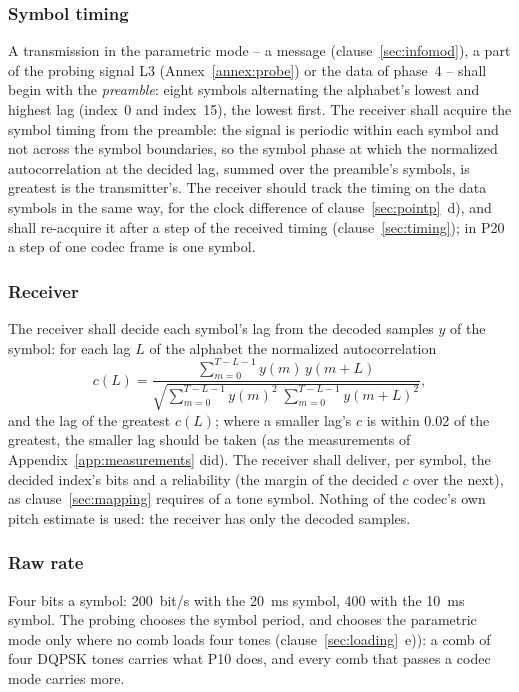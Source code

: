 \subsubsection{Symbol timing}
A transmission in the parametric mode -- a message
(clause~\ref{sec:infomod}), a part of the probing signal L3
(Annex~\ref{annex:probe}) or the data of phase~4 -- shall begin with the
\emph{preamble}: eight symbols alternating the alphabet's lowest and
highest lag (index~0 and index~15), the lowest first.  The receiver
shall acquire the symbol timing from the preamble: the signal is
periodic within each symbol and not across the symbol boundaries, so the
symbol phase at which the normalized autocorrelation at the decided lag,
summed over the preamble's symbols, is greatest is the transmitter's.
The receiver should track the timing on the data symbols in the same
way, for the clock difference of clause~\ref{sec:pointp}~d), and shall
re-acquire it after a step of the received timing
(clause~\ref{sec:timing}); in P20 a step of one codec frame is one
symbol.

\subsubsection{Receiver}
The receiver shall decide each symbol's lag from the decoded samples
$y$ of the symbol: for each lag $L$ of the alphabet the normalized
autocorrelation
\[ c(L) = \frac{\sum_{m=0}^{T-L-1} y(m)\,y(m+L)}
   {\sqrt{\sum_{m=0}^{T-L-1} y(m)^2 \;\sum_{m=0}^{T-L-1} y(m+L)^2}}, \]
and the lag of the greatest $c(L)$; where a smaller lag's $c$ is within
0.02 of the greatest, the smaller lag should be taken (as the
measurements of Appendix~\ref{app:measurements} did).  The receiver
shall deliver, per symbol, the decided index's bits and a reliability
(the margin of the decided $c$ over the next), as clause~\ref{sec:mapping}
requires of a tone symbol.  Nothing of the codec's own pitch estimate is
used: the receiver has only the decoded samples.

\subsubsection{Raw rate}
Four bits a symbol: 200~bit/s with the 20~ms symbol, 400 with the 10~ms
symbol.  The probing chooses the symbol period, and chooses the
parametric mode only where no comb loads four tones
(clause~\ref{sec:loading}~e)): a comb of four DQPSK tones carries what
P10 does, and every comb that passes a codec mode carries more.

